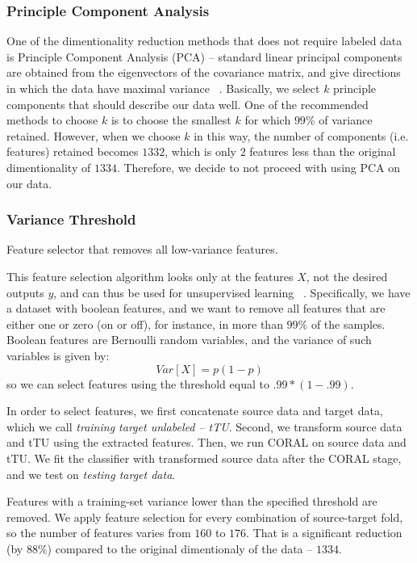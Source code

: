 \subsubsection{Principle Component Analysis}
One of the dimentionality reduction methods that does not require labeled data is Principle Component Analysis (PCA) -- standard linear principal components are obtained from the eigenvectors of the covariance matrix, and give directions in which the data have maximal variance ~\citep{hastie}. Basically, we select $k$ principle components that should describe our data well. One of the recommended methods to choose $k$ is to choose the smallest $k$ for which $99\%$ of variance retained. However, when we choose $k$ in this way, the number of components (i.e. features) retained becomes $1332$, which is only $2$ features less than the original dimentionality of $1334$. Therefore, we decide to not proceed with using PCA on our data.

\subsubsection{Variance Threshold}
\label{varthressub}

Feature selector that removes all low-variance features. 

This feature selection algorithm looks only at the features $X$, not the desired outputs $y$, and can thus be used for unsupervised learning ~\citep{varthres}. Specifically, we have a dataset with boolean features, and we want to remove all features that are either one or zero (on or off), for instance, in more than $99\%$ of the samples. Boolean features are Bernoulli random variables, and the variance of such variables is given by: \[ Var[X] = p(1-p)\] so we can select features using the threshold equal to $.99 * (1 - .99)$.

In order to select features, we first concatenate source data and target data, which we call \textit{training target unlabeled -- tTU}. Second, we transform source data and tTU using the extracted features. Then, we run CORAL on source data and tTU. We fit the classifier with transformed source data after the CORAL stage, and we test on \textit{testing target data}.

Features with a training-set variance lower than the specified threshold are removed. We apply feature selection for every combination of source-target fold, so the number of features varies from $160$ to $176$. That is a significant reduction (by $88\%$) compared to the original dimentionaly of the data -- $1334$. 

